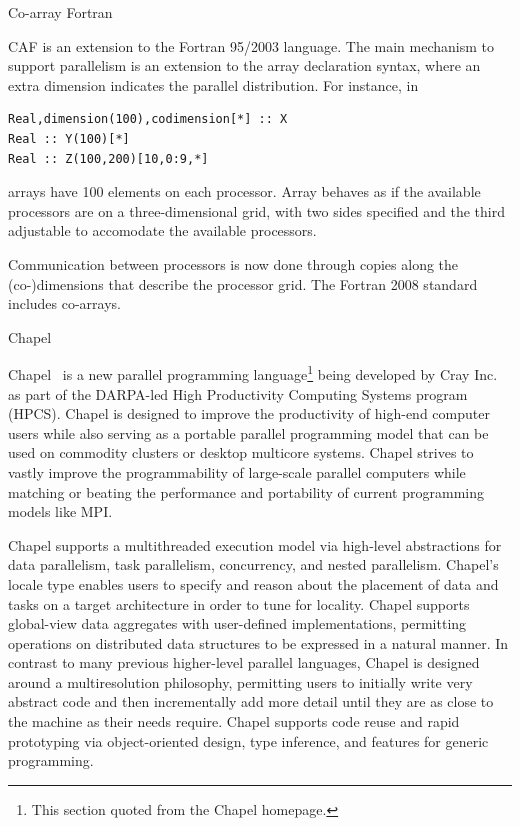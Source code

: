 
 {Co-array Fortran}

\acf{CAF} is an extension to the Fortran 95/2003 language.
The main mechanism to support parallelism is an extension to the array
declaration syntax, where an extra dimension indicates the parallel
distribution. For instance, in
\begin{verbatim}
Real,dimension(100),codimension[*] :: X
Real :: Y(100)[*]
Real :: Z(100,200)[10,0:9,*]
\end{verbatim}
arrays  have 100 elements on each processor.
Array  behaves as if the available processors
are on a three-dimensional grid, with two sides specified 
and the third adjustable to accomodate the available processors.

Communication between processors is now done through copies along the
(co-)dimensions that describe the processor grid.
The Fortran 2008 standard includes co-arrays.


 {Chapel}
\label{sec:Chapel}

Chapel~\cite{Chapel:homepage} is a new parallel programming
language\footnote{This section quoted from the Chapel homepage.}
being developed by Cray Inc. as part of the DARPA-led High
Productivity Computing Systems program (HPCS). Chapel is designed to
improve the productivity of high-end computer users while also serving
as a portable parallel programming model that can be used on commodity
clusters or desktop multicore systems. Chapel strives to vastly
improve the programmability of large-scale parallel computers while
matching or beating the performance and portability of current
programming models like MPI.

Chapel supports a multithreaded execution model via high-level
abstractions for data parallelism, task parallelism, concurrency, and
nested parallelism. Chapel's locale type enables users to specify and
reason about the placement of data and tasks on a target architecture
in order to tune for locality. Chapel supports global-view data
aggregates with user-defined implementations, permitting operations on
distributed data structures to be expressed in a natural manner. In
contrast to many previous higher-level parallel languages, Chapel is
designed around a multiresolution philosophy, permitting users to
initially write very abstract code and then incrementally add more
detail until they are as close to the machine as their needs
require. Chapel supports code reuse and rapid prototyping via
object-oriented design, type inference, and features for generic
programming.

